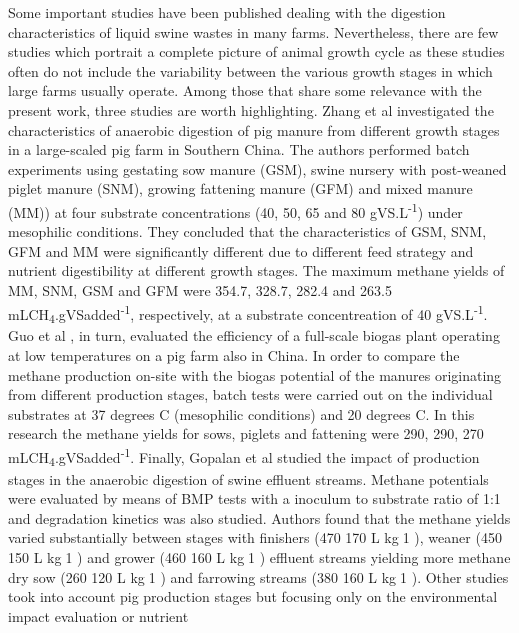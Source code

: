 Some important studies have been published dealing with the digestion characteristics of liquid swine wastes in many farms. Nevertheless, there are few studies which portrait a complete picture of animal growth cycle as these studies often do not include the variability between the various growth stages in which large farms usually operate. Among those that share some relevance with the present work, three studies are worth highlighting. Zhang et al \cite{Zhang_2014} investigated the characteristics of anaerobic digestion of pig manure from different growth stages in a large-scaled pig farm in Southern China. The authors performed batch experiments using gestating sow manure (GSM), swine nursery with post-weaned piglet manure (SNM), growing fattening manure (GFM) and mixed manure (MM))  at four substrate concentrations (40, 50, 65 and 80 gVS.L\textsuperscript{-1}) under mesophilic conditions. They concluded that the characteristics of GSM, SNM, GFM and MM were significantly different due to different feed strategy and nutrient digestibility at different growth stages. The maximum methane yields of MM, SNM, GSM and GFM were 354.7, 328.7, 282.4 and 263.5 mLCH\textsubscript{4}.gVSadded\textsuperscript{-1}, respectively, at a substrate concentreation of 40 gVS.L\textsuperscript{-1}. Guo et al \cite{Guo_2012}, in turn, evaluated the efficiency of a full-scale biogas plant operating at low temperatures on a pig farm also in China. In order to compare the methane production on-site with the biogas potential of the manures originating from different production stages, batch tests were carried out on the individual substrates at 37 degrees C (mesophilic conditions) and 20 degrees C. In this research the methane yields for sows, piglets and fattening were 290, 290, 270 mLCH\textsubscript{4}.gVSadded\textsuperscript{-1}. Finally, Gopalan et al \cite{Gopalan_2013} studied the impact of production stages in the anaerobic digestion of swine effluent streams. Methane potentials were evaluated by means of BMP tests with a inoculum to substrate ratio of 1:1 and degradation kinetics was also studied. Authors found that the methane yields varied substantially between stages with finishers (470 170 L kg1
), weaner (450  150 L kg1
) and grower (460  160 L kg1
)
effluent streams yielding more methane dry sow (260  120 L kg1
) and farrowing
streams (380  160 L kg1
). 
Other studies took into account pig production stages but focusing only on the environmental impact evaluation or nutrient
